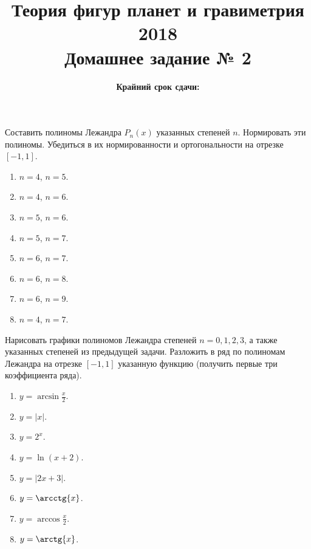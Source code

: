 \documentclass[11pt, a4paper,addpoints]{exam}
\title{{\Large Теория фигур планет и гравиметрия 2018}\\ 
    {\bf\Large Домашнее задание № 2}}
\author{}
\date{\normalsize\bf Крайний срок сдачи: \DTMusedate{deadline}}
\theoremstyle{remark}
\begin{document}
\maketitle
\thispagestyle{empty}
\begin{questions}
    \question[2] Составить полиномы Лежандра $P_n \left( x \right)$ указанных степеней $n$.
    Нормировать эти полиномы. Убедиться в их нормированности и ортогональности на отрезке $\left[
    -1, 1 \right]$.
    \begin{enumerate}
        \item $n = 4$, $n = 5$.
        \item $n = 4$, $n = 6$.
        \item $n = 5$, $n = 6$.
        \item $n = 5$, $n = 7$.
        \item $n = 6$, $n = 7$.
        \item $n = 6$, $n = 8$.
        \item $n = 6$, $n = 9$.
        \item $n = 4$, $n = 7$.
    \end{enumerate}
    \question[1] Нарисовать графики полиномов Лежандра степеней $n = 0, 1, 2, 3$, а также указанных
    степеней из предыдущей задачи.
    \question[2] Разложить в ряд по полиномам Лежандра на отрезке $\left[ -1, 1 \right]$ указанную
    функцию (получить первые три коэффициента ряда).
    \begin{enumerate}
        \item $y = \arcsin{\frac{x}{2}}$.
        \item $y = |x|$.
        \item $y = 2^x$.
        \item $y = \ln{\left( x + 2 \right)}$.
        \item $y = |2x + 3|$.
        \item $y = \arcctg{x}$.
        \item $y = \arccos{\frac{x}{2}}$.
        \item $y = \arctg{x}$.
    \end{enumerate}
    \end{questions}
\end{document}
